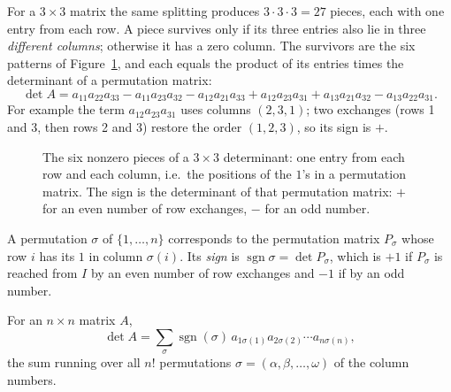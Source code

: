 For a $3\times 3$ matrix the same splitting produces $3\cdot 3\cdot 3=27$ pieces, each with
one entry from each row. A piece survives only if its three entries also lie in three
\emph{different columns}; otherwise it has a zero column. The survivors are the six patterns of
Figure~\ref{fig:u21-survivors}, and each equals the product of its entries times the
determinant of a permutation matrix:
\[
  \det A=a_{11}a_{22}a_{33}-a_{11}a_{23}a_{32}-a_{12}a_{21}a_{33}+a_{12}a_{23}a_{31}
  +a_{13}a_{21}a_{32}-a_{13}a_{22}a_{31}.
\]
For example the term $a_{12}a_{23}a_{31}$ uses columns $(2,3,1)$; two exchanges (rows 1 and
3, then rows 2 and 3) restore the order $(1,2,3)$, so its sign is $+$.

\begin{figure}[ht]
  \centering
  \caption{The six nonzero pieces of a $3\times 3$ determinant: one entry from each row and
  each column, i.e.\ the positions of the $1$'s in a permutation matrix. The sign is the
  determinant of that permutation matrix: $+$ for an even number of row exchanges, $-$ for an
  odd number.}
  \label{fig:u21-survivors}
\end{figure}

\begin{definition}\label{def:u21-sign}
A permutation $\sigma$ of $\{1,\dots,n\}$ corresponds to the permutation matrix $P_\sigma$
whose row $i$ has its $1$ in column $\sigma(i)$. Its \emph{sign} is
$\operatorname{sgn}\sigma=\det P_\sigma$, which is $+1$ if $P_\sigma$ is reached from $I$ by
an even number of row exchanges and $-1$ if by an odd number.
\end{definition}

\begin{theorem}\label{thm:u21-big}
For an $n\times n$ matrix $A$,
\[
  \det A=\sum_{\sigma}\operatorname{sgn}(\sigma)\,a_{1\sigma(1)}a_{2\sigma(2)}\cdots a_{n\sigma(n)},
\]
the sum running over all $n!$ permutations $\sigma=(\alpha,\beta,\dots,\omega)$ of the column
numbers.
\end{theorem}

